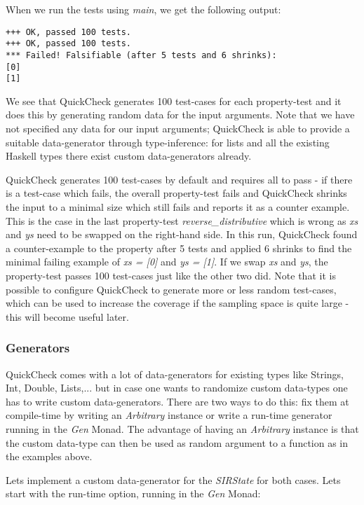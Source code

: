 When we run the tests using \textit{main}, we get the following output:

\begin{verbatim}
+++ OK, passed 100 tests.
+++ OK, passed 100 tests.
*** Failed! Falsifiable (after 5 tests and 6 shrinks):    
[0]
[1]
\end{verbatim}

We see that QuickCheck generates 100 test-cases for each property-test and it does this by generating random data for the input arguments. Note that we have not specified any data for our input arguments; QuickCheck is able to provide a suitable data-generator through type-inference: for lists and all the existing Haskell types there exist custom data-generators already.

QuickCheck generates 100 test-cases by default and requires all to pass - if there is a test-case which fails, the overall property-test fails and QuickCheck shrinks the input to a minimal size which still fails and reports it as a counter example. This is the case in the last property-test \textit{reverse\_distributive} which is wrong as \textit{xs} and \textit{ys} need to be swapped on the right-hand side. In this run, QuickCheck found a counter-example to the property after 5 tests and applied 6 shrinks to find the minimal failing example of \textit{xs = [0]} and \textit{ys = [1]}. If we swap \textit{xs} and \textit{ys}, the property-test passes 100 test-cases just like the other two did. Note that it is possible to configure QuickCheck to generate more or less random test-cases, which can be used to increase the coverage if the sampling space is quite large - this will become useful later.

\subsubsection*{Generators}
QuickCheck comes with a lot of data-generators for existing types like Strings, Int, Double, Lists,... but in case one wants to randomize custom data-types one has to write custom data-generators. There are two ways to do this: fix them at compile-time by writing an \textit{Arbitrary} instance or write a run-time generator running in the \textit{Gen} Monad. The advantage of having an \textit{Arbitrary} instance is that the custom data-type can then be used as random argument to a function as in the examples above.

Lets implement a custom data-generator for the \textit{SIRState} for both cases. Lets start with the run-time option, running in the \textit{Gen} Monad:

